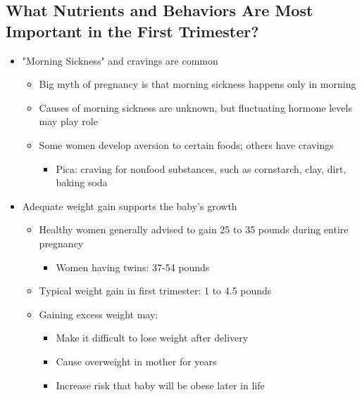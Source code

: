 \documentclass[12pt]{article}
\begin{document}
        \subsection{What Nutrients and Behaviors Are Most Important in the First Trimester?}
            \begin{itemize}
                \item "Morning Sickness" and cravings are common
                    \begin{itemize}
                        \item Big myth of pregnancy is that morning sickness happens only in morning
                        \item Causes of morning sickness are unknown, but fluctuating hormone levels may play role
                        \item Some women develop aversion to certain foods; others have cravings
                            \begin{itemize}
                                \item Pica: craving for nonfood substances, such as cornstarch, clay, dirt, baking soda
                            \end{itemize}
                    \end{itemize}
                \item Adequate weight gain supports the baby's growth
                    \begin{itemize}
                        \item Healthy women generally advised to gain 25 to 35 pounds during entire pregnancy
                            \begin{itemize}
                                \item Women having twins: 37-54 pounds
                            \end{itemize}
                        \item Typical weight gain in first trimester: 1 to 4.5 pounds
                        \item Gaining excess weight may:
                            \begin{itemize}
                                \item Make it difficult to lose weight after delivery
                                \item Cause overweight in mother for years
                                \item Increase risk that baby will be obese later in life

\end{itemize}
\end{itemize}
\end{itemize}
\end{document}
